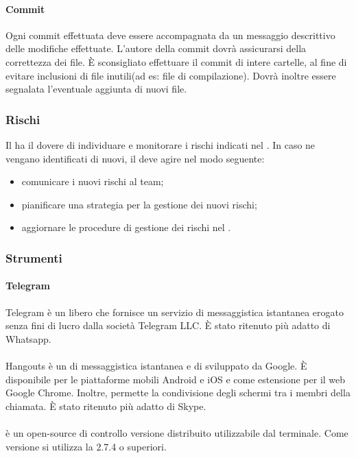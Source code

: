  \paragraph{Commit}
 Ogni commit effettuata deve essere accompagnata da un messaggio descrittivo delle modifiche effettuate. L'autore della commit dovrà assicurarsi della correttezza dei file. È sconsigliato effettuare il commit di intere cartelle, al fine di evitare inclusioni di file inutili(ad es: file di compilazione).
 Dovrà inoltre essere segnalata l'eventuale aggiunta di nuovi file.
 \subsubsection{Rischi}
 Il \RESP{} ha il dovere di individuare e monitorare i rischi indicati nel \PPdoc. In caso ne vengano identificati di nuovi, il \RESP{} deve agire nel modo seguente:
 \begin{itemize}
  \item comunicare i nuovi rischi al team;
  \item pianificare una strategia per la gestione dei nuovi rischi;
  \item aggiornare le procedure di gestione dei rischi nel \PPdoc.
 \end{itemize}
\subsubsection{Strumenti}
 \paragraph{Telegram}
 Telegram è un  libero che fornisce un servizio di messaggistica istantanea erogato senza fini di lucro dalla società Telegram LLC. È stato ritenuto più adatto di Whatsapp.
 \paragraph{}
 Hangouts è un  di messaggistica istantanea e di    sviluppato da Google. È disponibile per le piattaforme mobili Android e iOS e come estensione per il  web Google Chrome. Inoltre, permette la condivisione degli schermi tra i membri della chiamata. È stato ritenuto più adatto di Skype.
 \paragraph{}
  è un  open-source di controllo versione distribuito utilizzabile dal terminale. Come versione si utilizza la 2.7.4 o superiori.

